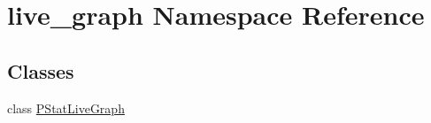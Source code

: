 \hypertarget{namespacelive__graph}{}\section{live\+\_\+graph Namespace Reference}
\label{namespacelive__graph}
\subsection*{Classes}
\begin{DoxyCompactItemize}
\item 
class \hyperlink{classlive__graph_1_1PStatLiveGraph}{P\+Stat\+Live\+Graph}
\end{DoxyCompactItemize}
